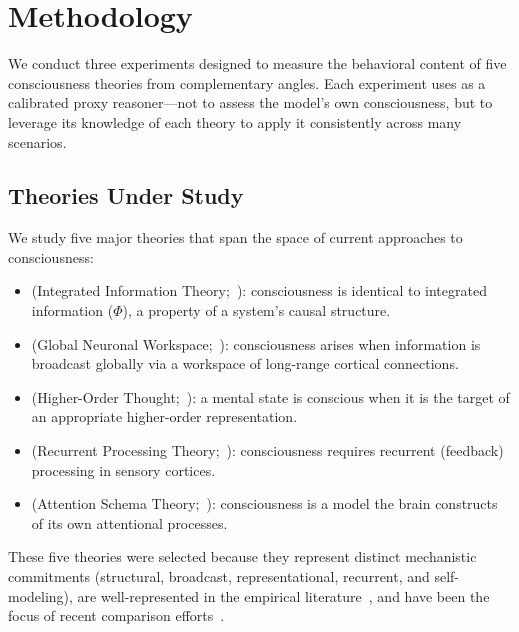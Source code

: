 \section{Methodology}
\label{sec:method}

We conduct three experiments designed to measure the behavioral content of five consciousness theories from complementary angles.
Each experiment uses \gptmodel as a calibrated proxy reasoner---not to assess the model's own consciousness, but to leverage its knowledge of each theory to apply it consistently across many scenarios.

\subsection{Theories Under Study}
\label{sec:theories}

We study five major theories that span the space of current approaches to consciousness:

\begin{itemize}[leftmargin=*,itemsep=2pt,topsep=2pt]
    \item \textbf{\IIT} (Integrated Information Theory;~\citealt{tononi2016iit}): consciousness is identical to integrated information ($\Phi$), a property of a system's causal structure.
    \item \textbf{\GNW} (Global Neuronal Workspace;~\citealt{dehaene2011gnw}): consciousness arises when information is broadcast globally via a workspace of long-range cortical connections.
    \item \textbf{\HOT} (Higher-Order Thought;~\citealt{rosenthal2005hot}): a mental state is conscious when it is the target of an appropriate higher-order representation.
    \item \textbf{\RPT} (Recurrent Processing Theory;~\citealt{lamme2006rpt}): consciousness requires recurrent (feedback) processing in sensory cortices.
    \item \textbf{\AST} (Attention Schema Theory;~\citealt{graziano2015attention}): consciousness is a model the brain constructs of its own attentional processes.
\end{itemize}

These five theories were selected because they represent distinct mechanistic commitments (structural, broadcast, representational, recurrent, and self-modeling), are well-represented in the empirical literature~\citep{yaron2022contrast}, and have been the focus of recent comparison efforts~\citep{melloni2023adversarial, butlin2023consciousness}.

